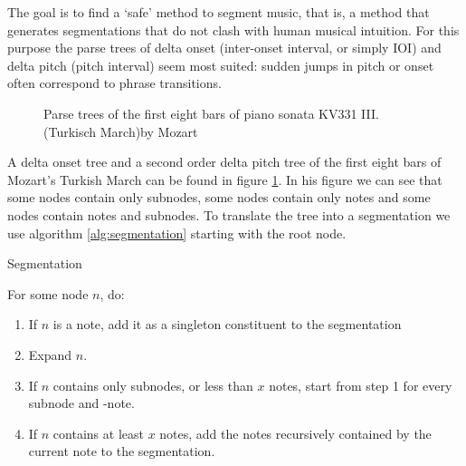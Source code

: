 \documentclass[a4paper,10pt]{article}
\begin{document}
The goal is to find a `safe' method to segment music, that is, a method that generates segmentations that do not clash with human musical intuition. For this purpose the parse trees of delta onset (inter-onset interval, or simply \textsc{IOI}) and delta pitch (pitch interval) seem most suited: sudden jumps in pitch or onset often correspond to phrase transitions. 
\begin{figure}
\centering
{}
\caption{Parse trees of the first eight bars of piano sonata KV331 III. (Turkisch March)by Mozart }
\label{fig:pitchonsettrees}
\end{figure}

A delta onset tree and a second order delta pitch tree of the first eight bars of Mozart's Turkish March can be found in figure \ref{fig:pitchonsettrees}. In his figure we can see that some nodes contain only subnodes, some nodes contain only notes and some nodes contain notes and subnodes. To translate the tree into a segmentation we use algorithm \ref{alg:segmentation} starting with the root node.
\begin{algorithm}
\caption{Segmentation}
\label{alg:segmentation}
For some node $n$, do:
\begin{enumerate}
\item If $n$ is a note, add it as a singleton constituent to the segmentation
\item Expand $n$.
\item If $n$ contains only subnodes, or less than $x$ notes, start from step 1 for every subnode and -note.
\item If $n$ contains at least $x$ notes, add the notes recursively contained by the current note to the segmentation.
\end{enumerate}
\end{algorithm}
\end{document}
